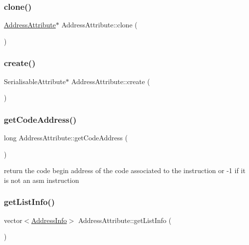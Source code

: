 \subsubsection{\texorpdfstring{clone()}{clone()}}
{\footnotesize\ttfamily \hyperlink{classAddressAttribute}{Address\+Attribute}$\ast$ Address\+Attribute\+::clone (\begin{DoxyParamCaption}{ }\end{DoxyParamCaption})}

\mbox{\label{classAddressAttribute_a25b4e25c9284dcdea23b761ca519dcd8}} 
\subsubsection{\texorpdfstring{create()}{create()}}
{\footnotesize\ttfamily Serialisable\+Attribute$\ast$ Address\+Attribute\+::create (\begin{DoxyParamCaption}{ }\end{DoxyParamCaption})}

\mbox{\label{classAddressAttribute_afebe2c5206d6e06ff5e479433a299ffa}} 
\subsubsection{\texorpdfstring{get\+Code\+Address()}{getCodeAddress()}}
{\footnotesize\ttfamily long Address\+Attribute\+::get\+Code\+Address (\begin{DoxyParamCaption}{ }\end{DoxyParamCaption})}

return the code begin address of the code associated to the instruction or -\/1 if it is not an asm instruction \mbox{\label{classAddressAttribute_ac7c1a2d8160f4db5423fd53dc305f886}} 
\subsubsection{\texorpdfstring{get\+List\+Info()}{getListInfo()}}
{\footnotesize\ttfamily vector$<$\hyperlink{classAddressInfo}{Address\+Info}$>$ Address\+Attribute\+::get\+List\+Info (\begin{DoxyParamCaption}{ }\end{DoxyParamCaption})}


